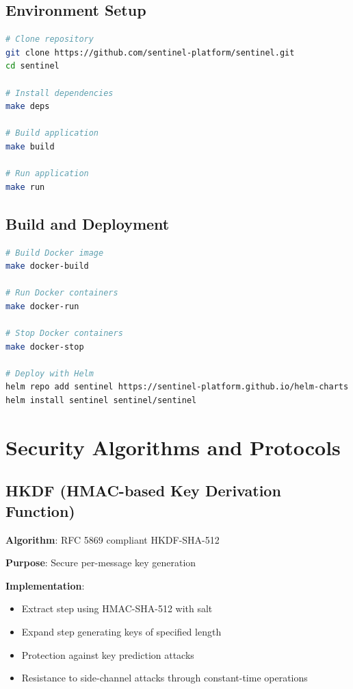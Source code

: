 \documentclass[12pt]{article}
\begin{document}
\subsection{Environment Setup}

\begin{lstlisting}[language=bash,caption=Environment Setup]
# Clone repository
git clone https://github.com/sentinel-platform/sentinel.git
cd sentinel

# Install dependencies
make deps

# Build application
make build

# Run application
make run
\end{lstlisting}

\subsection{Build and Deployment}

\begin{lstlisting}[language=bash,caption=Build and Deployment]
# Build Docker image
make docker-build

# Run Docker containers
make docker-run

# Stop Docker containers
make docker-stop

# Deploy with Helm
helm repo add sentinel https://sentinel-platform.github.io/helm-charts
helm install sentinel sentinel/sentinel
\end{lstlisting}

\section{Security Algorithms and Protocols}

\subsection{HKDF (HMAC-based Key Derivation Function)}

\textbf{Algorithm}: RFC 5869 compliant HKDF-SHA-512

\textbf{Purpose}: Secure per-message key generation

\textbf{Implementation}:
\begin{itemize}
    \item Extract step using HMAC-SHA-512 with salt
    \item Expand step generating keys of specified length
    \item Protection against key prediction attacks
    \item Resistance to side-channel attacks through constant-time operations
\end{itemize}
\end{document}
